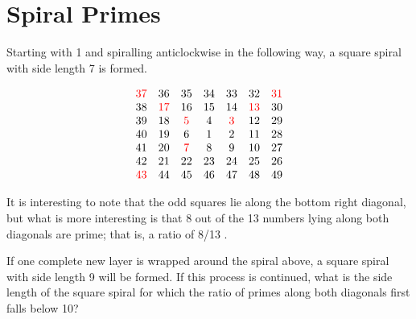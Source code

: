 \section{Spiral Primes}
Starting with 1 and spiralling anticlockwise in the following way, a square spiral with side length 7 is formed.
\begin{center}
	\[
		\begin{matrix}
			{\textcolor{red}{37}} & 36                  & 35                 & 34 & 33                 & 32                  & \textcolor{red}{31} \\
			38                    & \textcolor{red}{17} & 16                 & 15 & 14                 & \textcolor{red}{13} & 30                  \\
			39                    & 18                  & \textcolor{red}{5} & 4  & \textcolor{red}{3} & 12                  & 29                  \\
			40                    & 19                  & 6                  & 1  & 2                  & 11                  & 28                  \\
			41                    & 20                  & \textcolor{red}{7} & 8  & 9                  & 10                  & 27                  \\
			42                    & 21                  & 22                 & 23 & 24                 & 25                  & 26                  \\
			\textcolor{red}{43}   & 44                  & 45                 & 46 & 47                 & 48                  & 49                  \\
		\end{matrix}
	\]
\end{center}
It is interesting to note that the odd squares lie along the bottom right diagonal, but what is more interesting is that
8 out of the 13 numbers lying along both diagonals are prime; that is, a ratio of 8/13 .

If one complete new layer is wrapped around the spiral above, a square spiral with side length 9 will be formed. If this
process is continued, what is the side length of the square spiral for which the ratio of primes along both diagonals
first falls below 10?
